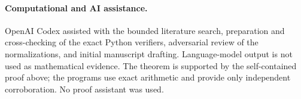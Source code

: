\documentclass[11pt]{article}
\begin{document}
\paragraph{Computational and AI assistance.}
OpenAI Codex assisted with the bounded literature search, preparation and
cross-checking of the exact Python verifiers, adversarial review of the
normalizations, and initial manuscript drafting.  Language-model output is
not used as mathematical evidence.  The theorem is supported by the
self-contained proof above; the programs use exact arithmetic and provide
only independent corroboration.  No proof assistant was used.

\small
\raggedright


\end{document}
